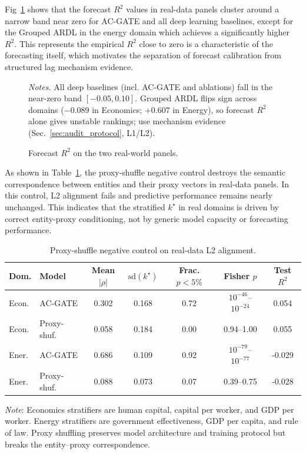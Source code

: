 \documentclass[conference]{IEEEtran}
\begin{document}
Fig~\ref{fig:r2_floor} shows that the forecast \(R^2\) values in real-data panels cluster around a narrow band near zero for AC-GATE and all deep learning baselines, except for the Grouped ARDL in the energy domain which achieves a significantly higher \(R^2\). This represents the empirical \(R^2\) close to zero is a characteristic of the forecasting itself, which motivates the separation of forecast calibration from structured lag mechanism evidence.

\begin{figure}[!tbhp]
  \centering
  
  \caption{Forecast $R^2$ on the two real-world panels.}
  {\footnotesize\raggedright\textit{Notes.} All deep baselines (incl. AC-GATE and ablations) fall in the near-zero band $[-0.05, 0.10]$. Grouped ARDL flips sign across domains ($-0.089$ in Economics; $+0.607$ in Energy), so forecast $R^2$ alone gives unstable rankings; use mechanism evidence (Sec.~\ref{sec:audit_protocol}, L1/L2).\par}
  \label{fig:r2_floor}
\end{figure}

As shown in Table~\ref{tab:proxy_shuffle_compact}, the proxy-shuffle negative control destroys the semantic correspondence between entities and their proxy vectors in real-data panels. In this control, L2 alignment fails and predictive performance remains nearly unchanged. This indicates that the stratified \(k^\star\) in real domains is driven by correct entity-proxy conditioning, not by generic model capacity or forecasting performance.
\begin{table}[!tbhp]
\centering
\caption{Proxy-shuffle negative control on real-data L2 alignment.}
\label{tab:proxy_shuffle_compact}
\scriptsize
\setlength{\tabcolsep}{2pt}
\renewcommand{\arraystretch}{1.05}
\begin{tabular}{llccccc}
\toprule
Dom. & Model & Mean $|\rho|$ & $\mathrm{sd}(k^\star)$ & Frac. $p<5\%$ & Fisher $p$ & Test $R^2$ \\
\midrule
Econ. & AC-GATE & 0.302 & 0.168 & 0.72 & $10^{-46}$--$10^{-24}$ & 0.054 \\
Econ. & Proxy-shuf. & 0.058 & 0.184 & 0.00 & 0.94--1.00 & 0.055 \\
Ener. & AC-GATE & 0.686 & 0.109 & 0.92 & $10^{-79}$--$10^{-77}$ & -0.029 \\
Ener. & Proxy-shuf. & 0.088 & 0.073 & 0.07 & 0.39--0.75 & -0.028 \\
\bottomrule
\end{tabular}
\vspace{1mm}
\begin{flushleft}
\footnotesize \textit{Note}: Economics stratifiers are human capital, capital per worker, and GDP per worker. Energy stratifiers are government effectiveness, GDP per capita, and rule of law. Proxy shuffling preserves model architecture and training protocol but breaks the entity--proxy correspondence.
\end{flushleft}
\end{table}
\end{document}

